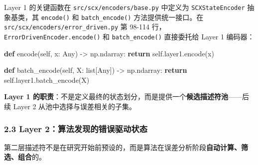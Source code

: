 \documentclass[
  12pt,
]{ctexart}
\newenvironment{Shaded}{}{}
\newcommand{\BuiltInTok}[1]{\textcolor[rgb]{0.00,0.50,0.00}{#1}}
\newcommand{\ControlFlowTok}[1]{\textcolor[rgb]{0.00,0.44,0.13}{\textbf{#1}}}
\newcommand{\KeywordTok}[1]{\textcolor[rgb]{0.00,0.44,0.13}{\textbf{#1}}}
\newcommand{\NormalTok}[1]{#1}
\newcommand{\OperatorTok}[1]{\textcolor[rgb]{0.40,0.40,0.40}{#1}}
\newcommand{\VariableTok}[1]{\textcolor[rgb]{0.10,0.09,0.49}{#1}}
\begin{document}
Layer 1 的关键函数在 \texttt{src/scx/encoders/base.py} 中定义为
\texttt{SCXStateEncoder} 抽象基类，其 \texttt{encode()} 和
\texttt{batch\_encode()} 方法提供统一接口。在
\texttt{src/scx/encoders/error\_driven.py} 第 98-114
行，\texttt{ErrorDrivenEncoder.encode()} 和 \texttt{batch\_encode()}
直接委托给 Layer 1 编码器：

\begin{Shaded}
\begin{Highlighting}[]
\KeywordTok{def}\NormalTok{ encode(}\VariableTok{self}\NormalTok{, x: Any) }\OperatorTok{{-}\textgreater{}}\NormalTok{ np.ndarray:}
    \ControlFlowTok{return} \VariableTok{self}\NormalTok{.layer1.encode(x)}

\KeywordTok{def}\NormalTok{ batch\_encode(}\VariableTok{self}\NormalTok{, X: }\BuiltInTok{list}\NormalTok{[Any]) }\OperatorTok{{-}\textgreater{}}\NormalTok{ np.ndarray:}
    \ControlFlowTok{return} \VariableTok{self}\NormalTok{.layer1.batch\_encode(X)}
\end{Highlighting}
\end{Shaded}

\textbf{Layer 1
的职责}：不是定义最终的状态划分，而是提供一个\textbf{候选描述符池}------后续
Layer 2 从池中选择与误差相关的子集。

\subsubsection{2.3 Layer
2：算法发现的错误驱动状态}\label{layer-2ux7b97ux6cd5ux53d1ux73b0ux7684ux9519ux8befux9a71ux52a8ux72b6ux6001}

第二层描述符不是在研究开始前预设的，而是算法在误差分析阶段\textbf{自动计算、筛选、组合}的。
\end{document}
